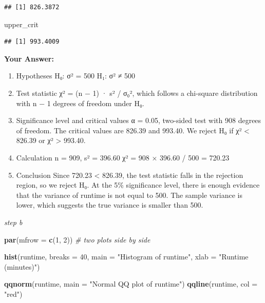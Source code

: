 \documentclass[
]{article}
\newenvironment{Shaded}{\begin{snugshade}}{\end{snugshade}}
\newcommand{\AttributeTok}[1]{\textcolor[rgb]{0.13,0.29,0.53}{#1}}
\newcommand{\CommentTok}[1]{\textcolor[rgb]{0.56,0.35,0.01}{\textit{#1}}}
\newcommand{\DecValTok}[1]{\textcolor[rgb]{0.00,0.00,0.81}{#1}}
\newcommand{\FunctionTok}[1]{\textcolor[rgb]{0.13,0.29,0.53}{\textbf{#1}}}
\newcommand{\NormalTok}[1]{#1}
\newcommand{\StringTok}[1]{\textcolor[rgb]{0.31,0.60,0.02}{#1}}
\begin{document}
\begin{verbatim}
## [1] 826.3872
\end{verbatim}

\begin{Shaded}
\begin{Highlighting}[]
\NormalTok{upper\_crit}
\end{Highlighting}
\end{Shaded}

\begin{verbatim}
## [1] 993.4009
\end{verbatim}

\textbf{Your Answer:}

\begin{enumerate}
\def\labelenumi{\arabic{enumi}.}
\item
  Hypotheses H₀: σ² = 500 H₁: σ² ≠ 500
\item
  Test statistic χ² = (n − 1) · s² / σ₀², which follows a chi-square
  distribution with n − 1 degrees of freedom under H₀.
\item
  Significance level and critical values α = 0.05, two-sided test with
  908 degrees of freedom. The critical values are 826.39 and 993.40. We
  reject H₀ if χ² \textless{} 826.39 or χ² \textgreater{} 993.40.
\item
  Calculation n = 909, s² = 396.60 χ² = 908 × 396.60 / 500 = 720.23
\item
  Conclusion Since 720.23 \textless{} 826.39, the test statistic falls
  in the rejection region, so we reject H₀. At the 5\% significance
  level, there is enough evidence that the variance of runtime is not
  equal to 500. The sample variance is lower, which suggests the true
  variance is smaller than 500.
\end{enumerate}

\emph{step b}

\begin{Shaded}
\begin{Highlighting}[]
\FunctionTok{par}\NormalTok{(}\AttributeTok{mfrow =} \FunctionTok{c}\NormalTok{(}\DecValTok{1}\NormalTok{, }\DecValTok{2}\NormalTok{))   }\CommentTok{\# two plots side by side}

\FunctionTok{hist}\NormalTok{(runtime, }\AttributeTok{breaks =} \DecValTok{40}\NormalTok{, }\AttributeTok{main =} \StringTok{"Histogram of runtime"}\NormalTok{, }\AttributeTok{xlab =} \StringTok{"Runtime (minutes)"}\NormalTok{)}

\FunctionTok{qqnorm}\NormalTok{(runtime, }\AttributeTok{main =} \StringTok{"Normal QQ plot of runtime"}\NormalTok{)}
\FunctionTok{qqline}\NormalTok{(runtime, }\AttributeTok{col =} \StringTok{"red"}\NormalTok{)}
\end{Highlighting}
\end{Shaded}
\end{document}
